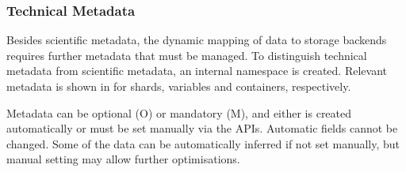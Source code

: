 

















\subsubsection{Technical Metadata}
\label{subsec: technical metadata}

Besides scientific metadata, the dynamic mapping of data to storage backends requires further metadata that must be managed.
To distinguish technical metadata from scientific metadata, an internal namespace is created.
Relevant metadata is shown in  for shards, variables and containers, respectively.

Metadata can be optional (O) or mandatory (M), and either is created automatically or must be set manually via the APIs.
Automatic fields cannot be changed.
Some of the data can be automatically inferred if not set manually, but manual setting may allow further optimisations.

